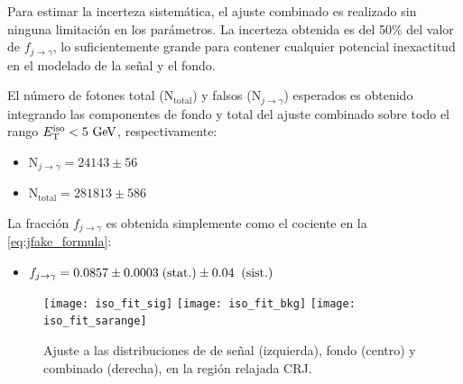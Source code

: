
Para estimar la incerteza sistemática, el ajuste combinado es realizado
sin ninguna limitación en los parámetros. La incerteza obtenida es del
50\% del valor de $f_{j\to\gamma}$, lo suficientemente grande para contener
cualquier potencial inexactitud en el modelado de la señal y el fondo.


El número de fotones total (N$_\text{total}$) y falsos (N$_{j\to\gamma}$)
esperados es obtenido integrando las componentes de fondo y total del ajuste
combinado sobre todo el rango $\etiso<5\gev$, respectivamente:

\begin{itemize}
\item[] N$_{j\to\gamma}= 24143 \pm 56$

\item[] N$_\text{total} = 281813 \pm 586$
\end{itemize}

La fracción $f_{j\to \gamma}$ es obtenida simplemente como el cociente
en la \cref{eq:jfake_formula}:

\begin{itemize}
\item[] $f_{j\rightarrow\gamma} = 0.0857 \pm 0.0003 \mbox{$\;$(stat.)} \pm 0.04 \;\mbox{$\;$(sist.)}$
\end{itemize}

\begin{figure}[!h]
  \centering

  \texttt{[image: iso\_fit\_sig]}
  \texttt{[image: iso\_fit\_bkg]}
  \texttt{[image: iso\_fit\_sarange]}

  \caption{Ajuste a las distribuciones de {\etiso} de señal (izquierda),
    fondo (centro) y combinado (derecha), en la región relajada CRJ.}
  \label{fig:jetfake_combfit}

\end{figure}



